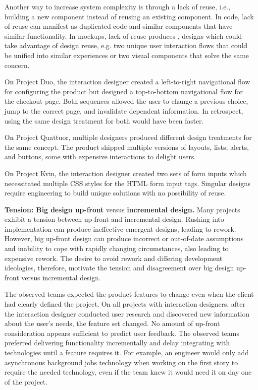 Another way to increase system complexity is through a lack of reuse, i.e., building a new component instead of reusing an existing component. In code, lack of reuse can manifest as duplicated code and similar components that have similar functionality. In mockups, lack of reuse produces , designs which could take advantage of design reuse, e.g. two unique user interaction flows that could be unified into similar experiences or two visual components that solve the same concern.

On Project Duo, the interaction designer created a left-to-right navigational flow for configuring the product but designed a top-to-bottom navigational flow for the checkout page. Both sequences allowed the user to change a previous choice, jump to the correct page, and invalidate dependent information. In retrospect, using the same design treatment for both would have been faster. 

On Project Quattuor, multiple designers produced different design treatments for the same concept. The product shipped multiple versions of layouts, lists, alerts, and buttons, some with expensive interactions to delight users. 

On Project Kvin, the interaction designer created two sets of form inputs which necessitated multiple CSS styles for the HTML form input tags. Singular designs require engineering to build unique solutions with no possibility of reuse.   

\textbf{Tension: Big design up-front} versus \textbf{incremental design.}
Many projects exhibit a tension between up-front and incremental design. Rushing into implementation can produce ineffective emergent designs, leading to rework. However, big up-front design can produce incorrect or out-of-date assumptions and inability to cope with rapidly changing circumstances, also leading to expensive rework. The desire to avoid rework and differing development ideologies, therefore, motivate the tension and disagreement over big design up-front versus incremental design. 

The observed teams expected the product features to change even when the client had clearly defined the project. On all projects with interaction designers, after the interaction designer conducted user research and discovered new information about the user's needs, the feature set changed. No amount of up-front consideration appears sufficient to predict user feedback. The observed teams preferred delivering functionality incrementally and delay integrating with technologies until a feature requires it. For example, an engineer would only add asynchronous background jobs technology when working on the first story to require the needed technology, even if the team knew it would need it on day one of the project.

